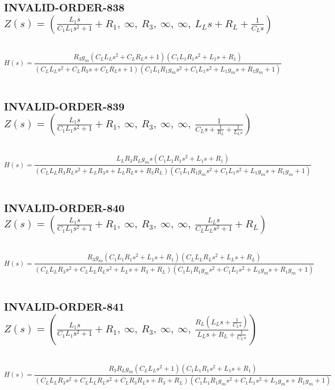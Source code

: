 \documentclass{article}
\begin{document}
\subsection{INVALID-ORDER-838 $Z(s) = \left( \frac{L_{1} s}{C_{1} L_{1} s^{2} + 1} + R_{1}, \  \infty, \  R_{3}, \  \infty, \  \infty, \  L_{L} s + R_{L} + \frac{1}{C_{L} s}\right)$ } \ 
\textbf{\[H(s) = \frac{R_{3} g_{m} \left(C_{L} L_{L} s^{2} + C_{L} R_{L} s + 1\right) \left(C_{1} L_{1} R_{1} s^{2} + L_{1} s + R_{1}\right)}{\left(C_{L} L_{L} s^{2} + C_{L} R_{3} s + C_{L} R_{L} s + 1\right) \left(C_{1} L_{1} R_{1} g_{m} s^{2} + C_{1} L_{1} s^{2} + L_{1} g_{m} s + R_{1} g_{m} + 1\right)}\] } \ 
\subsection{INVALID-ORDER-839 $Z(s) = \left( \frac{L_{1} s}{C_{1} L_{1} s^{2} + 1} + R_{1}, \  \infty, \  R_{3}, \  \infty, \  \infty, \  \frac{1}{C_{L} s + \frac{1}{R_{L}} + \frac{1}{L_{L} s}}\right)$ } \ 
\textbf{\[H(s) = \frac{L_{L} R_{3} R_{L} g_{m} s \left(C_{1} L_{1} R_{1} s^{2} + L_{1} s + R_{1}\right)}{\left(C_{L} L_{L} R_{3} R_{L} s^{2} + L_{L} R_{3} s + L_{L} R_{L} s + R_{3} R_{L}\right) \left(C_{1} L_{1} R_{1} g_{m} s^{2} + C_{1} L_{1} s^{2} + L_{1} g_{m} s + R_{1} g_{m} + 1\right)}\] } \ 
\subsection{INVALID-ORDER-840 $Z(s) = \left( \frac{L_{1} s}{C_{1} L_{1} s^{2} + 1} + R_{1}, \  \infty, \  R_{3}, \  \infty, \  \infty, \  \frac{L_{L} s}{C_{L} L_{L} s^{2} + 1} + R_{L}\right)$ } \ 
\textbf{\[H(s) = \frac{R_{3} g_{m} \left(C_{1} L_{1} R_{1} s^{2} + L_{1} s + R_{1}\right) \left(C_{L} L_{L} R_{L} s^{2} + L_{L} s + R_{L}\right)}{\left(C_{L} L_{L} R_{3} s^{2} + C_{L} L_{L} R_{L} s^{2} + L_{L} s + R_{3} + R_{L}\right) \left(C_{1} L_{1} R_{1} g_{m} s^{2} + C_{1} L_{1} s^{2} + L_{1} g_{m} s + R_{1} g_{m} + 1\right)}\] } \ 
\subsection{INVALID-ORDER-841 $Z(s) = \left( \frac{L_{1} s}{C_{1} L_{1} s^{2} + 1} + R_{1}, \  \infty, \  R_{3}, \  \infty, \  \infty, \  \frac{R_{L} \left(L_{L} s + \frac{1}{C_{L} s}\right)}{L_{L} s + R_{L} + \frac{1}{C_{L} s}}\right)$ } \ 
\textbf{\[H(s) = \frac{R_{3} R_{L} g_{m} \left(C_{L} L_{L} s^{2} + 1\right) \left(C_{1} L_{1} R_{1} s^{2} + L_{1} s + R_{1}\right)}{\left(C_{L} L_{L} R_{3} s^{2} + C_{L} L_{L} R_{L} s^{2} + C_{L} R_{3} R_{L} s + R_{3} + R_{L}\right) \left(C_{1} L_{1} R_{1} g_{m} s^{2} + C_{1} L_{1} s^{2} + L_{1} g_{m} s + R_{1} g_{m} + 1\right)}\] } \ 
\end{document}
